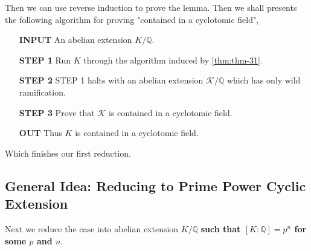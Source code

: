     Then we can use reverse induction to prove the lemma. Then we shall presents the following algorithm for proving "contained in a cyclotomic field",
    \begin{importantbox}
    \begin{enumerate}
        \item[\textbf{INPUT}] An abelian extension $K/\mathbb{Q}$.
        \item[\textbf{STEP 1}] Run $K$ through the algorithm induced by \autoref{thm:thm-31}.
        \item[\textbf{STEP 2}] STEP 1 halts with an abelian extension $\mathscr{K}/\mathbb{Q}$ which has only wild ramification.
        \item[\textbf{STEP 3}] Prove that $\mathscr{K}$ is contained in a cyclotomic field.
        \item[\textbf{OUT}] Thus $K$ is contained in a cyclotomic field.
    \end{enumerate}
    \end{importantbox}
    \noindent
    Which finishes our first reduction.
\subsection{General Idea: Reducing to Prime Power Cyclic Extension}
Next we reduce the case into abelian extension $K/\mathbb{Q}$ \textbf{such that $[K : \mathbb{Q}] = p^n$ for some $p$ and $n$}.

